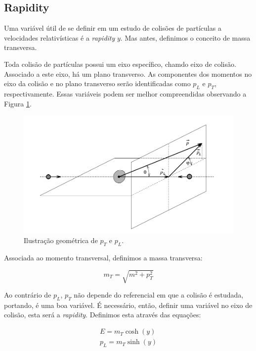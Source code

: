 \subsection{Rapidity}

Uma variável útil de se definir em um estudo de colisões de partículas a velocidades relativísticas é a {\it rapidity} $y$. Mas antes,
definimos o conceito de massa transversa.
\par
Toda colisão de partículas possui um eixo específico, chamdo eixo de colisão. Associado a este eixo, há um plano transverso. As componentes
dos momentos no eixo da colisão e no plano transverso serão identificadas como $p_{L}$ e $p_{T}$, respectivamente. Essas variáveis podem ser
melhor compreendidas observando a Figura \ref{fig:geometria}.

\begin{figure}[!h]
 \includegraphics[scale=0.35]{Content/geometriamomento.png}
 \caption{Ilustração geométrica de $p_T$ e $p_L$.}
 \label{fig:geometria}
\end{figure}


Associada ao momento transversal, definimos a massa transversa:

\begin{equation}
 m_{T}=\sqrt{m^2+p_{T}^2}
\end{equation}

Ao contrário de $p_{L}$, $p_{T}$ não depende do referencial em que a colisão é estudada, portando, é uma boa variável. É necessário, então,
definir uma variável no eixo de colisão, esta será a {\it rapidity}. Definimos esta através das equações:

\begin{subequations}
\begin{align}
 E=m_{T} \cosh{(y)} \\ p_{L}=m_{T} \sinh{(y)}
\end{align}
\end{subequations}

